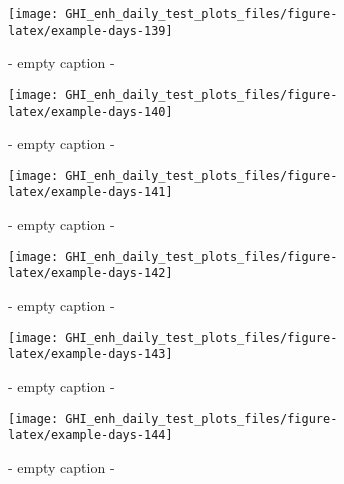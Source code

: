\documentclass[
  10pt,
  a4paper,oneside]{article}
\begin{document}
\begin{figure}[H]

{\centering \texttt{[image: GHI\_enh\_daily\_test\_plots\_files/figure-latex/example-days-139]} 

}

\caption{ - empty caption - }\label{fig:example-days-139}
\end{figure}

\begin{figure}[H]

{\centering \texttt{[image: GHI\_enh\_daily\_test\_plots\_files/figure-latex/example-days-140]} 

}

\caption{ - empty caption - }\label{fig:example-days-140}
\end{figure}

\begin{figure}[H]

{\centering \texttt{[image: GHI\_enh\_daily\_test\_plots\_files/figure-latex/example-days-141]} 

}

\caption{ - empty caption - }\label{fig:example-days-141}
\end{figure}

\begin{figure}[H]

{\centering \texttt{[image: GHI\_enh\_daily\_test\_plots\_files/figure-latex/example-days-142]} 

}

\caption{ - empty caption - }\label{fig:example-days-142}
\end{figure}

\begin{figure}[H]

{\centering \texttt{[image: GHI\_enh\_daily\_test\_plots\_files/figure-latex/example-days-143]} 

}

\caption{ - empty caption - }\label{fig:example-days-143}
\end{figure}

\begin{figure}[H]

{\centering \texttt{[image: GHI\_enh\_daily\_test\_plots\_files/figure-latex/example-days-144]} 

}

\caption{ - empty caption - }\label{fig:example-days-144}
\end{figure}
\end{document}
